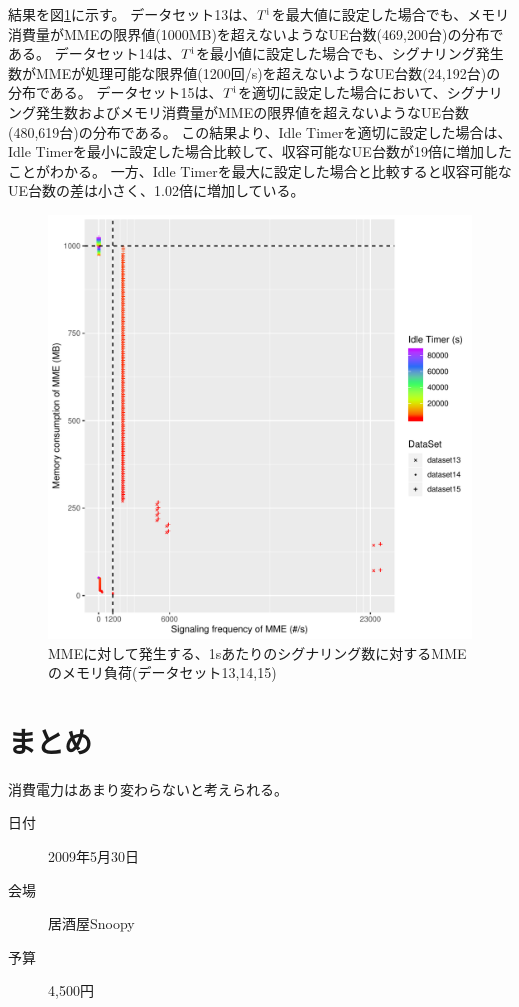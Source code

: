\documentclass[a4j]{ujarticle}
\begin{document}
結果を図\ref{13_14_15_signaling_vs_memoryload_all_15s}に示す。
データセット13は、$T^{\rm i}$を最大値に設定した場合でも、メモリ消費量がMMEの限界値(1000MB)を超えないようなUE台数(469,200台)の分布である。
データセット14は、$T^{\rm i}$を最小値に設定した場合でも、シグナリング発生数がMMEが処理可能な限界値(1200回/s)を超えないようなUE台数(24,192台)の分布である。
データセット15は、$T^{\rm i}$を適切に設定した場合において、シグナリング発生数およびメモリ消費量がMMEの限界値を超えないようなUE台数(480,619台)の分布である。
この結果より、Idle Timerを適切に設定した場合は、Idle Timerを最小に設定した場合比較して、収容可能なUE台数が19倍に増加したことがわかる。
一方、Idle Timerを最大に設定した場合と比較すると収容可能なUE台数の差は小さく、1.02倍に増加している。
\begin{figure}[htbp]
  \centering
  \includegraphics[width=0.9\hsize]{13_14_15_signaling_vs_memoryload_all_15s.pdf}
  \caption{MMEに対して発生する、1sあたりのシグナリング数に対するMMEのメモリ負荷(データセット13,14,15)}
  \label{13_14_15_signaling_vs_memoryload_all_15s}
\end{figure}

\section{まとめ}
消費電力はあまり変わらないと考えられる。
\begin{description}
  \item[日付] 2009年5月30日
  \item[会場] 居酒屋Snoopy
  \item[予算] 4,500円
\end{description}
\clearpage
\end{document}
